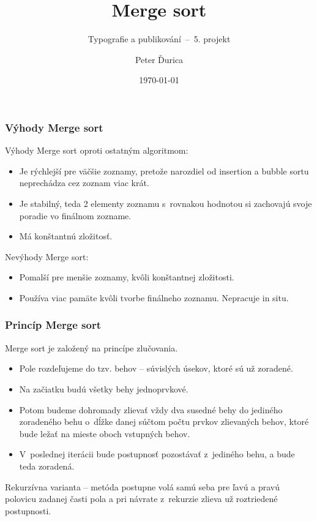 \documentclass[10pt,xcolor=pdflatex,hyperref={unicode}]{beamer}
\title{Merge sort}
\subtitle{Typografie a publikování \,--\, 5. projekt}
\author{Peter Ďurica}
\institute{Vysoké učení technické v~Brně\\Fakulta informačních technologií}
\date{\today}
\begin{document}
\frame[plain]{\titlepage}

\begin{frame}
\frametitle{Výhody Merge sort}
Výhody Merge sort oproti ostatným algoritmom:\pause
\begin{itemize}
 \item<2->Je rýchlejší pre väčšie zoznamy, pretože narozdiel od insertion a bubble sortu neprechádza cez zoznam viac krát.
 \item<3-> Je stabilný, teda 2 elementy zoznamu s~rovnakou hodnotou si zachovajú svoje poradie vo finálnom zozname.
 \item<4-> Má konštantnú zložitosť.
\end{itemize}
\pause\pause\pause
Nevýhody Merge sort:
\begin{itemize}
 \item<6-> Pomalší pre menšie zoznamy, kvôli konštantnej zložitosti.
 \item<7-> Používa viac pamäte kvôli tvorbe finálneho zoznamu. Nepracuje \alert{in situ}.
\end{itemize}
\end{frame}

\begin{frame}
\frametitle{Princíp Merge sort}
Merge sort je založený na princípe \alert{zlučovania}.
\begin{itemize}
    \item Pole rozdeľujeme do tzv. \alert{behov} – súvislých úsekov, ktoré sú už zoradené.
    \item Na začiatku budú všetky behy jednoprvkové.
    \item Potom budeme dohromady zlievať vždy dva susedné behy do jediného zoradeného behu o~dĺžke danej súčtom počtu prvkov zlievaných behov, ktoré bude ležať na mieste oboch vstupných behov.
    \item V~poslednej iterácii bude postupnosť pozostávať z~jediného behu, a bude teda \alert{zoradená}.
\end{itemize}
Rekurzívna varianta – metóda postupne volá samú seba pre ľavú a
pravú polovicu zadanej časti pola a pri návrate z~rekurzie zlieva už
roztriedené postupnosti.
\end{frame}
\end{document}
